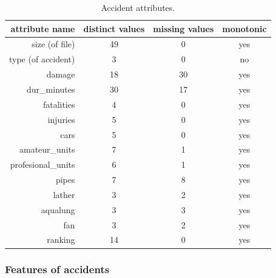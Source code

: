 \begin{table}
\centering
\begin{tabular}{|r||c|c|c|}
\hline
attribute name & distinct values & missing values & monotonic\\
\hline
\hline
size (of file) & 49 & 0 & yes\\
\hline
type (of accident) & 3 & 0 & no\\
\hline
damage & 18 & 30 & yes\\
\hline
dur\_minutes & 30 & 17 & yes\\
\hline
fatalities & 4 & 0 & yes\\
\hline
injuries & 5 & 0 & yes\\
\hline
cars & 5 & 0 & yes\\
\hline
amateur\_units & 7 & 1 & yes\\
\hline
profesional\_units & 6 & 1 & yes\\
\hline
pipes & 7 & 8 & yes\\
\hline
lather & 3 & 2 & yes\\
\hline
aqualung & 3 & 3 & yes\\
\hline
fan & 3 & 2 & yes\\
\hline
ranking & 14 & 0 & yes\\
\hline
\end{tabular}

\caption{Accident attributes.}
\label{img:ch40_attributes_description}
\end{table}


\subsubsection{Features of accidents} \label{sec:ch40_features}


